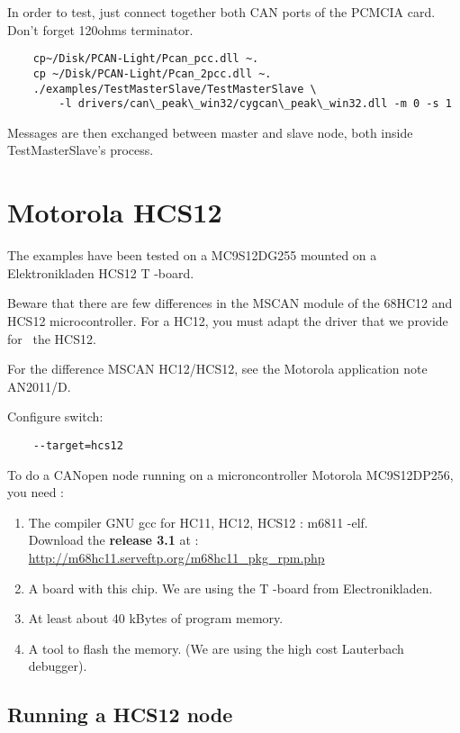 \documentclass[12pt,english,a4paper]{book}
\newcommand{\canopen}{CANopen }
\begin{document}
In order to test, just connect together both CAN ports of the PCMCIA
card. Don't forget 120ohms terminator.

\begin{verbatim}
	cp~/Disk/PCAN-Light/Pcan_pcc.dll ~.
	cp ~/Disk/PCAN-Light/Pcan_2pcc.dll ~.
	./examples/TestMasterSlave/TestMasterSlave \
		-l drivers/can\_peak\_win32/cygcan\_peak\_win32.dll -m 0 -s 1
\end{verbatim}
Messages are then exchanged between master and slave node, both inside
TestMasterSlave's process.

\section{Motorola HCS12}

The examples have been tested on a MC9S12DG255 mounted on a Elektronikladen
HCS12 T -board.

Beware that there are few differences in the MSCAN module of the 68HC12
and HCS12 microcontroller. For a HC12, you must adapt the driver that
we provide for \ the HCS12.

For the difference MSCAN HC12/HCS12, see the Motorola application
note AN2011/D.

Configure switch:

\begin{verbatim}
	--target=hcs12
\end{verbatim}

To do a \canopen node running on a microncontroller Motorola MC9S12DP256,
you need :

\begin{enumerate}
\item The compiler GNU gcc for HC11, HC12, HCS12 : m6811 -elf. \\
 Download the \textbf{release 3.1} at : \href{http://m68hc11.serveftp.org/m68hc11_pkg_rpm.php}{http://m68hc11.serveftp.org/m68hc11\_pkg\_rpm.php} 
\item A board with this chip. We are using the T -board from Electronikladen. 
\item At least about 40 kBytes of program memory. 
\item A tool to flash the memory. (We are using the high cost Lauterbach
debugger). 
\end{enumerate}

\subsection{Running a HCS12 node}
\end{document}
